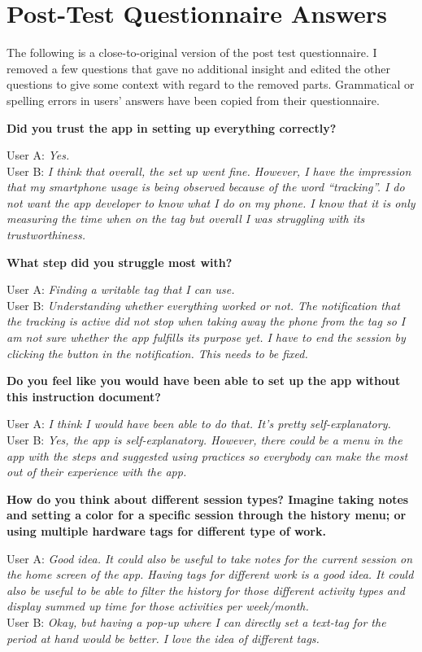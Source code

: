 \documentclass[conference]{IEEEtran}
\newcommand{\surveyquestion}[3]{%
	\noindent\textbf{#1}
	
	\noindent User A: \textit{#2}\\
	User B: \textit{#3}
}
\begin{document}




\appendices

\section{Post-Test Questionnaire Answers}
\label{app:questionnaire}
The following is a close-to-original version of the post test questionnaire. I removed a few questions that gave no additional insight and edited the other questions to give some context with regard to the removed parts. Grammatical or spelling errors in users' answers have been copied from their questionnaire.

\surveyquestion{Did you trust the app in setting up everything correctly?}{
	Yes.
}{
	I think that overall, the set up went fine. However, I have the impression that my smartphone usage is being observed because of the word “tracking”. I do not want the app developer to know what I do on my phone. I know that it is only measuring the time when on the tag but overall I was struggling with its trustworthiness.
}

\surveyquestion{What step did you struggle most with?}{
	Finding a writable tag that I can use.
}{
	Understanding whether everything worked or not. The notification that the tracking is active did not stop when taking away the phone from the tag so I am not sure whether the app fulfills its purpose yet. I have to end the session by clicking the button in the notification. This needs to be fixed.
}

\surveyquestion{Do you feel like you would have been able to set up the app without this instruction document?}{
	I think I would have been able to do that. It's pretty self-explanatory.
}{
	Yes, the app is self-explanatory. However, there could be a menu in the app with the steps and suggested using practices so everybody can make the most out of their experience with the app.
}

\surveyquestion{How do you think about different session types? Imagine taking notes and setting a color for a specific session through the history menu; or using multiple hardware tags for different type of work.}{
	Good idea. It could also be useful to take notes for the current session on the home screen of the app. Having tags for different work is a good idea. It could also be useful to be able to filter the history for those different activity types and display summed up time for those activities per week/month.
}{
	Okay, but having a pop-up where I can directly set a text-tag for the period at hand would be better. I love the idea of different tags.
}
\end{document}
